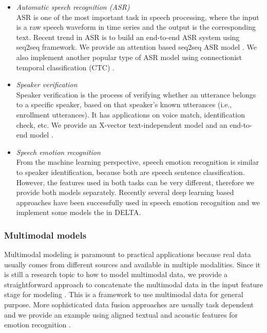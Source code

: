\documentclass{article}
\begin{document}
\begin{itemize}
    \item \textit{Automatic speech recognition (ASR)}\\
    ASR is one of the most important task in speech processing, where the input is a raw speech waveform in time series and the output is the corresponding text. Recent trend in ASR is to build an end-to-end ASR system using seq2seq framework. We provide an attention based seq2seq ASR model \citep{chan2016listen,bahdanau2016end}. We also implement another popular type of ASR model using connectionist temporal classification (CTC) \citep{graves2006connectionist}.



    \item \textit{Speaker verification}\\
    Speaker verification is the process of verifying whether an utterance belongs to a specific speaker, based on that speaker's known utterances (i.e., enrollment utterances). It has applications on voice match, identification check, etc. We provide an X-vector text-independent model \citep{snyder2018xvector} and an end-to-end model \citep{wan2017ge2e}.



    \item \textit{Speech emotion recognition}\\
    From the machine learning perspective, speech emotion recognition is similar to speaker identification, because both are speech sentence classification. However, the features used in both tasks can be very different, therefore we provide both models separately. Recently several deep learning based approaches have been successfully used in speech emotion recognition \citep{han2014speech,satt2017efficient} and we implement some models the in DELTA.









\end{itemize}

\subsubsection{Multimodal models}
Multimodal modeling is paramount to practical applications because real data usually comes from different sources and available in multiple modalities. Since it is still a research topic to how to model multimodal data, we provide a straightforward approach to concatenate the multimodal data in the input feature stage for modeling \citep{ngiam2011multimodal}. This is a framework to use multimodal data for general purpose. More sophisticated data fusion approaches are usually task dependent and we provide an example using aligned textual and acoustic features for emotion recognition \citep{xu2019alignment}.
\end{document}
